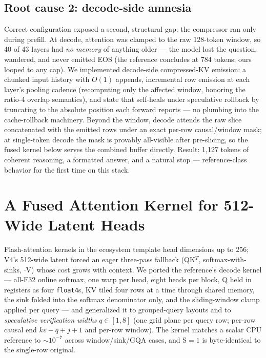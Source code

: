 \documentclass[11pt]{article}
\begin{document}
\subsection{Root cause 2: decode-side amnesia}

Correct configuration exposed a second, structural gap: the compressor
ran only during prefill. At decode, attention was clamped to the raw
128-token window, so 40 of 43 layers had \emph{no memory} of anything
older --- the model lost the question, wandered, and never emitted EOS
(the reference concludes at 784 tokens; ours looped to any cap). We
implemented decode-side compressed-KV emission: a chunked input history
with $O(1)$ appends, incremental row emission at each layer's pooling
cadence (recomputing only the affected window, honoring the ratio-4
overlap semantics), and state that self-heals under speculative rollback
by truncating to the absolute position each forward reports --- no
plumbing into the cache-rollback machinery. Beyond the window,
decode attends the raw slice concatenated with the emitted rows under an
exact per-row causal/window mask; at single-token decode the mask is
provably all-visible after pre-slicing, so the fused kernel below serves
the combined buffer directly. Result: 1{,}127 tokens of coherent
reasoning, a formatted answer, and a natural stop --- reference-class
behavior for the first time on this stack.

\section{A Fused Attention Kernel for 512-Wide Latent Heads}

Flash-attention kernels in the ecosystem template head dimensions up to
256; V4's 512-wide latent forced an eager three-pass fallback (QK$^T$,
softmax-with-sinks, $\cdot$V) whose cost grows with context. We ported
the reference's decode kernel --- all-F32 online softmax, one warp per
head, eight heads per block, Q held in registers as four
\texttt{float4}s, KV tiled four rows at a time through shared memory, the
sink folded into the softmax denominator only, and the sliding-window
clamp applied per query --- and generalized it to grouped-query layouts
and to \emph{speculative verification widths} $q \in [1,8]$ (one grid
plane per query row; per-row causal end $kv{-}q{+}j{+}1$ and per-row
window). The kernel matches a scalar CPU reference to $\sim$$10^{-7}$
across window/sink/GQA cases, and S$=1$ is byte-identical to the
single-row original.
\end{document}
